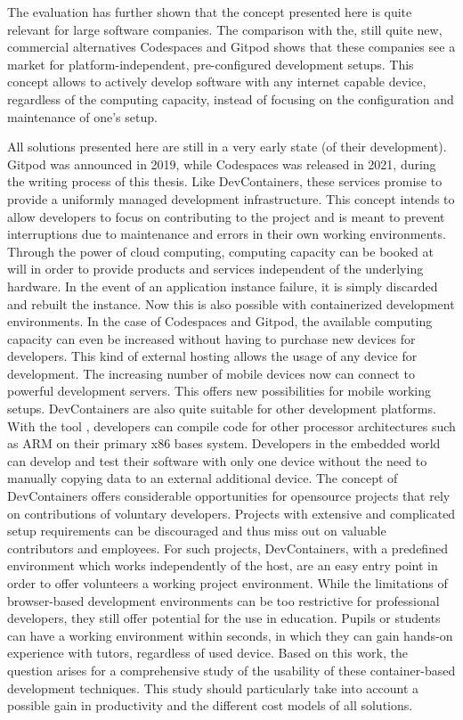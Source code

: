 The evaluation has further shown that the concept presented here is quite relevant for large software companies. The comparison with the, still quite new, commercial alternatives Codespaces and Gitpod shows that these companies see a market for platform-independent, pre-configured development setups. This concept allows to actively develop software with any internet capable device, regardless of the computing capacity, instead of focusing on the configuration and maintenance of one's setup.

All solutions presented here are still in a very early state (of their development). Gitpod was announced in 2019, while Codespaces was released in 2021, during the writing process of this thesis. Like DevContainers, these services promise to provide a uniformly managed development infrastructure. This concept intends to allow developers to focus on contributing to the project and is meant to prevent interruptions due to maintenance and errors in their own working environments. Through the power of cloud computing, computing capacity can be booked at will in order to provide products and services independent of the underlying hardware. In the event of an application instance failure, it is simply discarded and rebuilt the instance. Now this is also possible with containerized development environments. In the case of Codespaces and Gitpod, the available computing capacity can even be increased without having to purchase new devices for developers. This kind of external hosting allows the usage of any device for development. The increasing number of mobile devices now can connect to powerful development servers. This offers new possibilities for mobile working setups. DevContainers are also quite suitable for other development platforms. With the tool , developers can compile code for other processor architectures such as ARM on their primary x86 bases system. Developers in the embedded world can develop and test their software with only one device without the need to manually copying data to an external additional device.\newline
The concept of DevContainers offers considerable opportunities for opensource projects that rely on contributions of voluntary developers. Projects with extensive and complicated setup requirements can be discouraged and thus miss out on valuable contributors and employees. For such projects, DevContainers, with a predefined environment which works independently of the host, are an easy entry point in order to offer volunteers a working project environment. While the limitations of browser-based development environments can be too restrictive for professional developers, they still offer potential for the use in education. Pupils or students can have a working environment within seconds, in which they can gain hands-on experience with tutors, regardless of used device.\newline
Based on this work, the question arises for a comprehensive study of the usability of these container-based development techniques. This study should particularly take into account a possible gain in productivity and the different cost models of all solutions.
